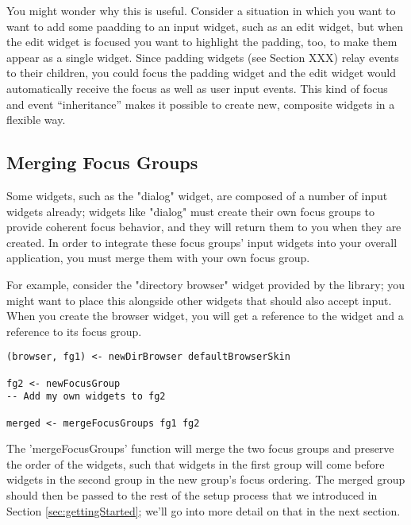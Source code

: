 You might wonder why this is useful.  Consider a situation in which
you want to want to add some paadding to an input widget, such as an
edit widget, but when the edit widget is focused you want to highlight
the padding, too, to make them appear as a single widget.  Since
padding widgets (see Section XXX) relay events to their children, you
could focus the padding widget and the edit widget would automatically
receive the focus as well as user input events.  This kind of focus
and event ``inheritance'' makes it possible to create new, composite
widgets in a flexible way.

\subsection{Merging Focus Groups}

Some widgets, such as the "dialog" widget, are composed of a number of
input widgets already; widgets like "dialog" must create their own
focus groups to provide coherent focus behavior, and they will return
them to you when they are created.  In order to integrate these focus
groups' input widgets into your overall application, you must merge
them with your own focus group.

For example, consider the "directory browser" widget provided by the
library; you might want to place this alongside other widgets that
should also accept input.  When you create the browser widget, you will
get a reference to the widget and a reference to its focus group.

\begin{verbatim}
(browser, fg1) <- newDirBrowser defaultBrowserSkin

fg2 <- newFocusGroup
-- Add my own widgets to fg2

merged <- mergeFocusGroups fg1 fg2
\end{verbatim}

The 'mergeFocusGroups' function will merge the two focus groups and
preserve the order of the widgets, such that widgets in the first
group will come before widgets in the second group in the new group's
focus ordering.  The merged group should then be passed to the rest of
the setup process that we introduced in Section
\ref{sec:gettingStarted}; we'll go into more detail on that in the
next section.
